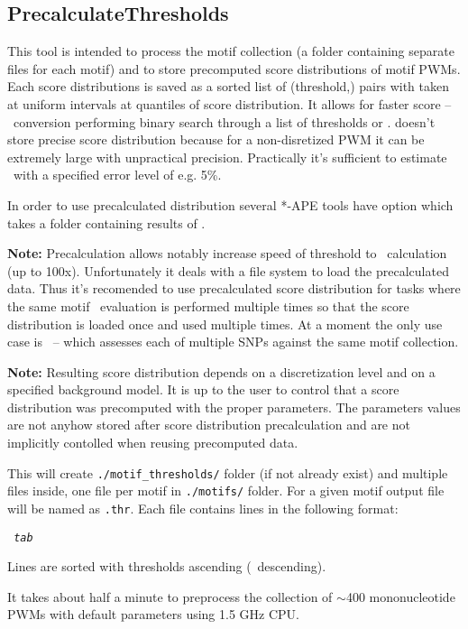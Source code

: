\subsection{PrecalculateThresholds}
This tool is intended to process the motif collection (a folder containing separate
files for each motif) and to store precomputed score distributions of motif PWMs. Each score distributions is saved as a sorted list of \mbox{(threshold,\pvalue)} pairs with \pvalues taken at uniform intervals at quantiles of score distribution. It allows for faster score -- \pvalue\ conversion performing binary search through a list of thresholds or \pvalues.  doesn't store precise score distribution because for a non-disretized PWM it can be extremely large with unpractical precision. Practically it's sufficient to estimate \pvalue\ with a specified error level of e.g. 5\%.

In order to use precalculated distribution several *-APE tools have  option which takes a folder containing results of .

\textbf{Note:} Precalculation allows notably increase speed of threshold to \pvalue\ calculation (up to 100x). Unfortunately it deals with a file system to load the precalculated data. Thus it's recomended to use precalculated score distribution for tasks where the same motif \pvalue\ evaluation is performed multiple times so that the score distribution is loaded once and used multiple times. At a moment the only use case is ~--  which assesses each of multiple SNPs against the same motif collection.

\textbf{Note:} Resulting score distribution depends on a discretization level and on a specified background model. It is up to the user to control that a score distribution was precomputed with the proper parameters. The parameters values are not anyhow stored after score distribution precalculation and are not implicitly contolled when reusing precomputed data.

\usageheader
{}

\example{}

This will create \texttt{./motif\_thresholds/} folder (if not already exist) and multiple files inside, one file per motif in \texttt{./motifs/} folder. For a given motif output file will be named as \texttt{.thr}.
Each file contains lines in the following format:

\texttt{ \textit{tab} }

Lines are sorted with thresholds ascending (\pvalue\ descending).

It takes about half a minute to preprocess the collection of $\sim$400 mononucleotide PWMs with default
parameters using 1.5 GHz CPU.
